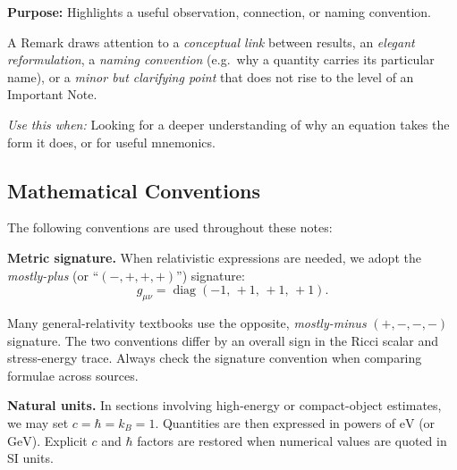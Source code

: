 \bigskip

\noindent
\begin{minipage}{0.9\textwidth}
  \begin{remark}
    \textbf{Purpose:} Highlights a useful observation, connection, or naming convention.

    A Remark draws attention to a \emph{conceptual link} between results, an
    \emph{elegant reformulation}, a \emph{naming convention} (e.g.\ why a quantity
    carries its particular name), or a \emph{minor but clarifying point} that does
    not rise to the level of an Important Note.

    \smallskip
    \textit{Use this when:} Looking for a deeper understanding of why an equation
    takes the form it does, or for useful mnemonics.
  \end{remark}
\end{minipage}


\clearpage
\subsection*{Mathematical Conventions}

The following conventions are used throughout these notes:

\medskip
\noindent\textbf{Metric signature.}\quad
When relativistic expressions are needed, we adopt the \emph{mostly-plus} (or ``$(-, +, +, +)$'') signature:
\[
  g_{\mu\nu} = \operatorname{diag}(-1,\,+1,\,+1,\,+1).
\]

\begin{importantnote}
  Many general-relativity textbooks use the opposite, \emph{mostly-minus}
  $(+,-,-,-)$ signature. The two conventions differ by an overall sign in
  the Ricci scalar and stress-energy trace.
  Always check the signature convention when comparing formulae across sources.
\end{importantnote}

\bigskip
\noindent\textbf{Natural units.}\quad
In sections involving high-energy or compact-object estimates,
we may set $c = \hbar = k_B = 1$.
Quantities are then expressed in powers of $\mathrm{eV}$ (or $\mathrm{GeV}$).
Explicit $c$ and $\hbar$ factors are restored when numerical values are quoted
in SI units.

